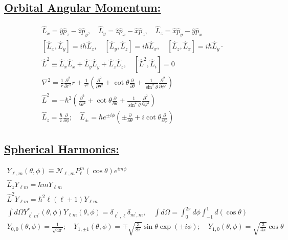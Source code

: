 \documentclass[a4paper,12pt]{article}
\begin{document}
\subsection*{\underline{Orbital Angular Momentum:}}
\begin{gather}
    \hat{L}_{x}=\hat{y} \hat{p}_{z}-\hat{z} \hat{p}_{y}, \quad \hat{L}_{y}=\hat{z} \hat{p}_{x}-\hat{x} \hat{p}_{z}, \quad \hat{L}_{z}=\hat{x} \hat{p}_{y}-\hat{y} \hat{p}_{x} \\
    {\left[\hat{L}_{x}, \hat{L}_{y}\right]=i \hbar \hat{L}_{z}, \quad\left[\hat{L}_{y}, \hat{L}_{z}\right]=i \hbar \hat{L}_{x}, \quad\left[\hat{L}_{z}, \hat{L}_{x}\right]=i \hbar \hat{L}_{y} \cdot} \\
    \hat{L}^{2} \equiv \hat{L}_{x} \hat{L}_{x}+\hat{L}_{y} \hat{L}_{y}+\hat{L}_{z} \hat{L}_{z}, \quad\left[\hat{L}^{2}, \hat{L}_{i}\right]=0 \\
    \nabla^{2}=\frac{1}{r} \frac{\partial^{2}}{\partial r^{2}} r+\frac{1}{r^{2}}\left(\frac{\partial^{2}}{\partial \theta^{2}}+\cot \theta \frac{\partial}{\partial \theta}+\frac{1}{\sin ^{2} \theta} \frac{\partial^{2}}{\partial \phi^{2}}\right) \\
    \hat{L}^{2}=-\hbar^{2}\left(\frac{\partial^{2}}{\partial \theta^{2}}+\cot \theta \frac{\partial}{\partial \theta}+\frac{1}{\sin ^{2} \theta} \frac{\partial^{2}}{\partial \phi^{2}}\right) \\
    \hat{L}_{z}=\frac{\hbar}{i} \frac{\partial}{\partial \phi} ; \quad \hat{L}_{\pm}=\hbar e^{\pm i \phi}\left(\pm \frac{\partial}{\partial \theta}+i \cot \theta \frac{\partial}{\partial \phi}\right)
\end{gather}
\subsection*{\underline{Spherical Harmonics:}}
\begin{gather}
    Y_{\ell, m}(\theta, \phi) \equiv \mathcal{N}_{\ell, m} P_{\ell}^{m}(\cos \theta) e^{i m \phi}\\
    \hat{L}_{z} Y_{\ell m}=\hbar m Y_{\ell m}\\
    \hat{L}^{2} Y_{\ell m}=\hbar^{2} \ell(\ell+1) Y_{\ell m}\\
    \int d \Omega Y_{\ell^{\prime} m^{\prime}}^{*}(\theta, \phi) Y_{\ell m}(\theta, \phi)=\delta_{\ell^{\prime}, \ell} \delta_{m^{\prime}, m}, \quad \int d \Omega=\int_{0}^{2 \pi} d \phi \int_{-1}^{1} d(\cos \theta)\\
    Y_{0,0}(\theta, \phi)=\frac{1}{\sqrt{4 \pi}} ; \quad Y_{1, \pm 1}(\theta, \phi)=\mp \sqrt{\frac{3}{8 \pi}} \sin \theta \exp (\pm i \phi) ; \quad Y_{1,0}(\theta, \phi)=\sqrt{\frac{3}{4 \pi}} \cos \theta
\end{gather}
\end{document}
